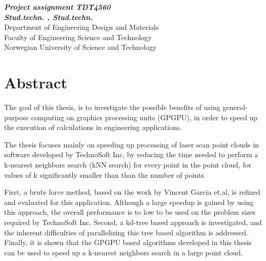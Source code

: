 \begin{center}
{\Large\bfseries \mytitle}
\end{center}

\begin{center}
{\bfseries\slshape Project assignment TDT4560}
\\[1.0cm]
{\bfseries\slshape
Stud.techn. \myauthorA, Stud.techn. \myauthorB \\}
Department of Engineering Design and Materials \\
Faculty of Engineering Science and Technology\\
Norwegian University of Science and Technology
\end{center}
\section*{Abstract}

The goal of this thesis, is to investigate the possible benefits of using general-purpose computing on graphics processing units (GPGPU), in order to speed up the execution of calculations in engineering applications.

The thesis focuses mainly on speeding up processing of laser scan point clouds in software developed by TechnoSoft Inc, by reducing the time needed to perform a k-nearest neighbors search (kNN search) for every point in the point cloud, for values of k significantly smaller than than the number of points.

First, a brute force method, based on the work by Vincent Garcia et.al, is refined and evaluated for this application. Although a large speedup is gained by using this approach, the overall performance is to low to be used on the problem sizes required by TechnoSoft Inc. Second, a kd-tree based approach is investigated, and the inherent difficulties of parallelizing this tree based algorithm is addressed. Finally, it is shown that the GPGPU based algorithms developed in this thesis can be used to speed up a k-nearest neighbors search in a large point cloud.


\clearpage\
